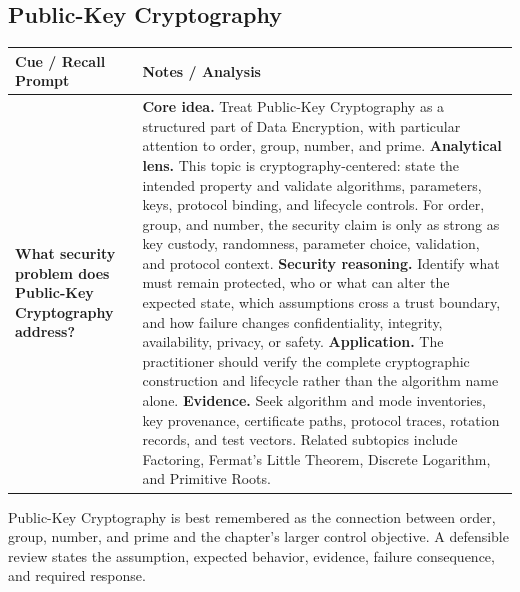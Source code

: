\documentclass[11pt]{article}
\newcommand{\CornellHeader}{%
\rowcolor{Navy}\color{white}\bfseries Cue / Recall Prompt & \color{white}\bfseries Notes / Analysis\\\hline}
\newcommand{\CornellRow}[2]{%
\cellcolor{CueGray}\RaggedRight\textbf{#1} & \RaggedRight #2\\\hline}
\begin{document}
\subsection*{Public-Key Cryptography}
\begin{longtable}{>{\RaggedRight\arraybackslash}p{}|>{\RaggedRight\arraybackslash}p{}}
\CornellHeader
\CornellRow{What security problem does Public-Key Cryptography address?}{\textbf{Core idea.} Treat Public-Key Cryptography as a structured part of Data Encryption, with particular attention to order, group, number, and prime. \textbf{Analytical lens.} This topic is cryptography-centered: state the intended property and validate algorithms, parameters, keys, protocol binding, and lifecycle controls. For order, group, and number, the security claim is only as strong as key custody, randomness, parameter choice, validation, and protocol context. \textbf{Security reasoning.} Identify what must remain protected, who or what can alter the expected state, which assumptions cross a trust boundary, and how failure changes confidentiality, integrity, availability, privacy, or safety. \textbf{Application.} The practitioner should verify the complete cryptographic construction and lifecycle rather than the algorithm name alone. \textbf{Evidence.} Seek algorithm and mode inventories, key provenance, certificate paths, protocol traces, rotation records, and test vectors. Related subtopics include Factoring, Fermat's Little Theorem, Discrete Logarithm, and Primitive Roots.}
\end{longtable}
\begin{topicsummary}
Public-Key Cryptography is best remembered as the connection between order, group, number, and prime and the chapter's larger control objective. A defensible review states the assumption, expected behavior, evidence, failure consequence, and required response.
\end{topicsummary}
\end{document}
